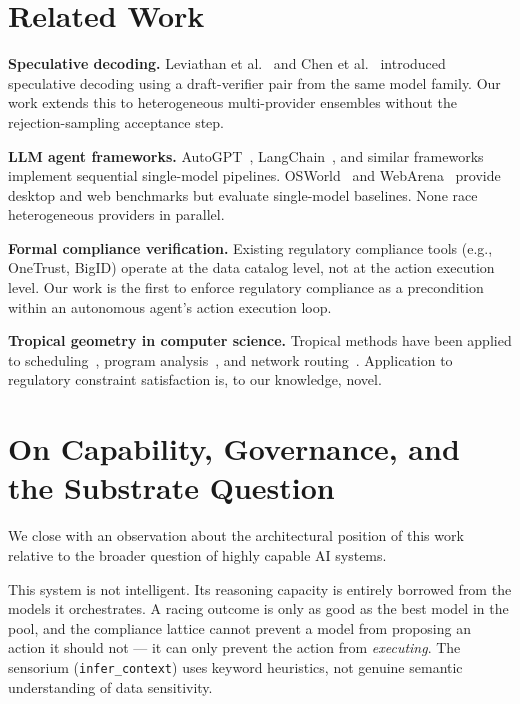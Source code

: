 \documentclass[11pt,twocolumn]{article}
\begin{document}
\section{Related Work}
\label{sec:related}

\textbf{Speculative decoding.} Leviathan et al.~\cite{leviathan2023fast} and Chen et
al.~\cite{chen2023accelerating} introduced speculative decoding using a draft-verifier
pair from the same model family. Our work extends this to heterogeneous multi-provider
ensembles without the rejection-sampling acceptance step.

\textbf{LLM agent frameworks.} AutoGPT~\cite{autogpt2023}, LangChain~\cite{chase2022langchain},
and similar frameworks implement sequential single-model pipelines. OSWorld~\cite{xie2024osworld}
and WebArena~\cite{zhou2023webarena} provide desktop and web benchmarks but evaluate
single-model baselines. None race heterogeneous providers in parallel.

\textbf{Formal compliance verification.} Existing regulatory compliance tools (e.g.,
OneTrust, BigID) operate at the data catalog level, not at the action execution level.
Our work is the first to enforce regulatory compliance as a precondition within an
autonomous agent's action execution loop.

\textbf{Tropical geometry in computer science.}
Tropical methods have been applied to scheduling~\cite{gaubert1997methods},
program analysis~\cite{chaudhuri2010continuity}, and network
routing~\cite{gondran2008graphs}. Application to regulatory constraint satisfaction
is, to our knowledge, novel.

\section{On Capability, Governance, and the Substrate Question}
\label{sec:substrate}

We close with an observation about the architectural position of this work relative
to the broader question of highly capable AI systems.

This system is not intelligent. Its reasoning capacity is entirely borrowed from
the models it orchestrates. A racing outcome is only as good as the best model
in the pool, and the compliance lattice cannot prevent a model from proposing
an action it should not — it can only prevent the action from \emph{executing}.
The sensorium (\texttt{infer\_context}) uses keyword heuristics, not genuine
semantic understanding of data sensitivity.
\end{document}

